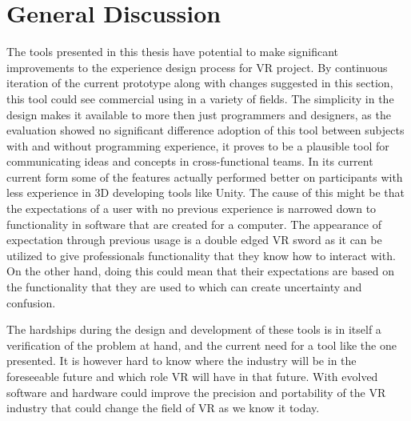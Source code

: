 \section{General Discussion}

The tools presented in this thesis have potential to make significant improvements to the experience design process for VR project. By continuous iteration of the current prototype along with changes suggested in this section, this tool could see commercial using in a variety of fields. The simplicity in the design makes it available to more then just programmers and designers, as the evaluation showed no significant difference adoption of this tool between subjects with and without programming experience, it proves to be a plausible tool for communicating ideas and concepts in cross-functional teams. In its current current form some of the features  actually performed better on participants with less experience in 3D developing tools like Unity. The cause of this might be that the expectations of a user with no previous experience is narrowed down to functionality in software that are created for a computer. The appearance of expectation through previous usage is a double edged VR sword as it can be utilized to give professionals functionality that they know how to interact with. On the other hand, doing this could mean that their expectations are based on the functionality that they are used to which can create uncertainty and confusion.

The hardships during the design and development of these tools is in itself a verification of the problem at hand, and the current need for a tool like the one presented. It is however hard to know where the industry will be in the foreseeable future and which role VR will have in that future. With evolved software and hardware could improve the precision and portability of the VR industry that could change the field of VR as we know it today.

